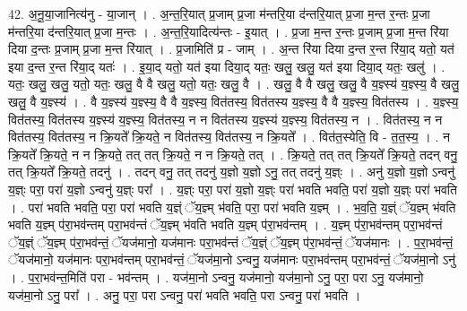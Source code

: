 \documentclass[17pt]{extarticle}
\begin{document}
42. अ॒नू॒या॒जानित्य॑नु - या॒जान् । . अ॒न्त॒रि॒यात् प्र॒जाम् प्र॒जा म॑न्तरि॒या द॑न्तरि॒यात् प्र॒जा म॒न्त र॒न्तः प्र॒जा म॑न्तरि॒या द॑न्तरि॒यात् प्र॒जा म॒न्तः । . अ॒न्त॒रि॒यादित्य॑न्तः - इ॒यात् । . प्र॒जा म॒न्त र॒न्तः प्र॒जाम् प्र॒जा म॒न्त रि॑या दिया द॒न्तः प्र॒जाम् प्र॒जा म॒न्त रि॑यात् । . प्र॒जामिति॑ प्र - जाम् । . अ॒न्त रि॑या दिया द॒न्त र॒न्त रि॑या॒द् यतो॒ यत॑ इया द॒न्त र॒न्त रि॑या॒द् यतः॑ । . इ॒या॒द् यतो॒ यत॑ इया दिया॒द् यतः॒ खलु॒ खलु॒ यत॑ इया दिया॒द् यतः॒ खलु॑ । . यतः॒ खलु॒ खलु॒ यतो॒ यतः॒ खलु॒ वै वै खलु॒ यतो॒ यतः॒ खलु॒ वै । . खलु॒ वै वै खलु॒ खलु॒ वै य॒ज्ञ्स्य॑ य॒ज्ञ्स्य॒ वै खलु॒ खलु॒ वै य॒ज्ञ्स्य॑ । . वै य॒ज्ञ्स्य॑ य॒ज्ञ्स्य॒ वै वै य॒ज्ञ्स्य॒ वित॑तस्य॒ वित॑तस्य य॒ज्ञ्स्य॒ वै वै य॒ज्ञ्स्य॒ वित॑तस्य । . य॒ज्ञ्स्य॒ वित॑तस्य॒ वित॑तस्य य॒ज्ञ्स्य॑ य॒ज्ञ्स्य॒ वित॑तस्य॒ न न वित॑तस्य य॒ज्ञ्स्य॑ य॒ज्ञ्स्य॒ वित॑तस्य॒ न । . वित॑तस्य॒ न न वित॑तस्य॒ वित॑तस्य॒ न क्रि॒यते᳚ क्रि॒यते॒ न वित॑तस्य॒ वित॑तस्य॒ न क्रि॒यते᳚ । . वित॑त॒स्येति॒ वि - त॒त॒स्य॒ । . न क्रि॒यते᳚ क्रि॒यते॒ न न क्रि॒यते॒ तत् तत् क्रि॒यते॒ न न क्रि॒यते॒ तत् । . क्रि॒यते॒ तत् तत् क्रि॒यते᳚ क्रि॒यते॒ तदन् वनु॒ तत् क्रि॒यते᳚ क्रि॒यते॒ तदनु॑ । . तदन् वनु॒ तत् तदनु॑ य॒ज्ञो य॒ज्ञो ऽनु॒ तत् तदनु॑ य॒ज्ञ्ः । . अनु॑ य॒ज्ञो य॒ज्ञो ऽन्वनु॑ य॒ज्ञ्ः परा॒ परा॑ य॒ज्ञो ऽन्वनु॑ य॒ज्ञ्ः परा᳚ । . य॒ज्ञ्ः परा॒ परा॑ य॒ज्ञो य॒ज्ञ्ः परा॑ भवति भवति॒ परा॑ य॒ज्ञो य॒ज्ञ्ः परा॑ भवति । . परा॑ भवति भवति॒ परा॒ परा॑ भवति य॒ज्ञ्ं ॅय॒ज्ञ्म् भ॑वति॒ परा॒ परा॑ भवति य॒ज्ञ्म् । . भ॒व॒ति॒ य॒ज्ञ्ं ॅय॒ज्ञ्म् भ॑वति भवति य॒ज्ञ्म् प॑रा॒भव॑न्तम् परा॒भव॑न्तं ॅय॒ज्ञ्म् भ॑वति भवति य॒ज्ञ्म् प॑रा॒भव॑न्तम् । . य॒ज्ञ्म् प॑रा॒भव॑न्तम् परा॒भव॑न्तं ॅय॒ज्ञ्ं ॅय॒ज्ञ्म् प॑रा॒भव॑न्तं॒ ॅयज॑मानो॒ यज॑मानः परा॒भव॑न्तं ॅय॒ज्ञ्ं ॅय॒ज्ञ्म् प॑रा॒भव॑न्तं॒ ॅयज॑मानः । . प॒रा॒भव॑न्तं॒ ॅयज॑मानो॒ यज॑मानः परा॒भव॑न्तम् परा॒भव॑न्तं॒ ॅयज॑मा॒नो ऽन्वनु॒ यज॑मानः परा॒भव॑न्तम् परा॒भव॑न्तं॒ ॅयज॑मा॒नो ऽनु॑ । . प॒रा॒भव॑न्त॒मिति॑ परा - भव॑न्तम् । . यज॑मा॒नो ऽन्वनु॒ यज॑मानो॒ यज॑मा॒नो ऽनु॒ परा॒ परा ऽनु॒ यज॑मानो॒ यज॑मा॒नो ऽनु॒ परा᳚ । . अनु॒ परा॒ परा ऽन्वनु॒ परा॑ भवति भवति॒ परा ऽन्वनु॒ परा॑ भवति । \newline
\pagebreak
{}
\end{document}
